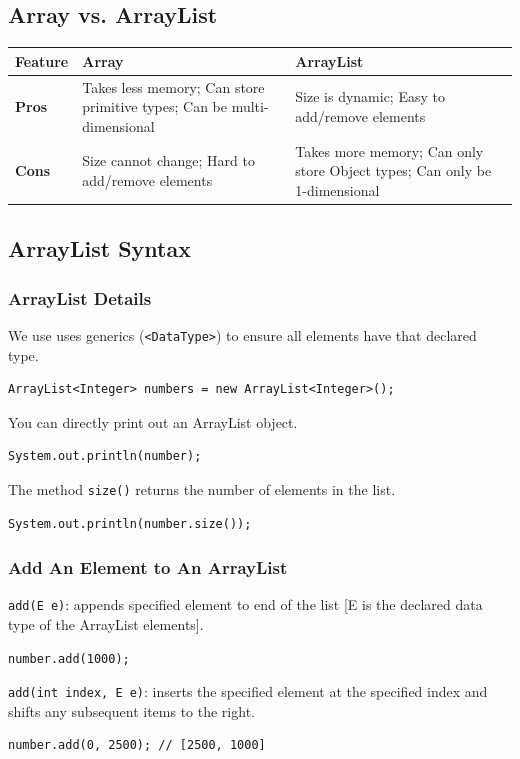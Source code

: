 \documentclass[letterpaper,12pt]{article}
\begin{document}
\subsection{Array vs. ArrayList}

\begin{table}[h]
    \centering
    \renewcommand{\arraystretch}{1}
    \begin{tabular}{|l|p{6cm}|p{6cm}|}
        \hline
        \textbf{Feature} & \textbf{Array} & \textbf{ArrayList} \\
        \hline
        \textbf{Pros} & Takes less memory; Can store primitive types; Can be multi-dimensional & Size is dynamic; Easy to add/remove elements\\
        \hline
        \textbf{Cons} & Size cannot change; Hard to add/remove elements & Takes more memory; Can only store Object types; Can only be 1-dimensional\\
        \hline
    \end{tabular}
\end{table}

\subsection{ArrayList Syntax}
\subsubsection{ArrayList Details}
We use uses generics (\texttt{<DataType>}) to ensure all elements have that declared type.
\begin{verbatim}
ArrayList<Integer> numbers = new ArrayList<Integer>();
\end{verbatim}
You can directly print out an ArrayList object.
\begin{verbatim}
System.out.println(number);
\end{verbatim}
The method \texttt{size()} returns the number of elements in the list.
\begin{verbatim}
System.out.println(number.size());
\end{verbatim}
\subsubsection{Add An Element to An ArrayList}
\texttt{add(E e)}: appends specified element to end of the list [E is the declared data type of the ArrayList elements].
\begin{verbatim}
number.add(1000);
\end{verbatim}
\texttt{add(int index, E e)}: inserts the specified element at the specified index and shifts any subsequent items to the right.
\begin{verbatim}
number.add(0, 2500); // [2500, 1000]
\end{verbatim}
\end{document}
